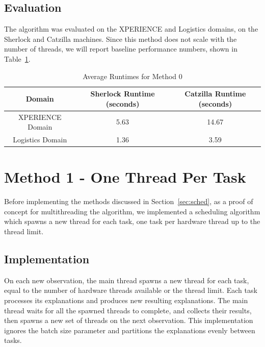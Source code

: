\documentclass[12pt,twoside,abbrevs,msc,ai,notimes,logo,sansheadings]{infthesis}
\begin{document}
  \section{Evaluation}
  
  The algorithm was evaluated on the XPERIENCE and Logistics domains, on the Sherlock and Catzilla machines. Since this method does not scale with the number of threads, we will report baseline performance numbers, shown in Table~\ref{tab:m0}.
  
  \begin{table}[!htbp]
  \begin{tabular}{c c c}
  Domain & Sherlock Runtime (seconds) & Catzilla Runtime (seconds)\tabularnewline
  \hline
  XPERIENCE Domain & 5.63 & 14.67\tabularnewline
  Logistics Domain & 1.36 & 3.59\tabularnewline
  \hline
  \end{tabular}
  \caption{Average Runtimes for Method 0}
  \label{tab:m0}
  \end{table}

  \chapter {Method 1 - One Thread Per Task}
  
  Before implementing the methods discussed in Section~\ref{sec:sched}, as a proof of concept for multithreading the algorithm, we implemented a scheduling algorithm which spawns a new thread for each task, one task per hardware thread up to the thread limit.
  
  \section {Implementation}
  
  On each new observation,  the main thread spawns a new thread for each task, equal to the number of hardware threads available or the thread limit. Each task processes its explanations and produces new resulting explanations. The main thread waits for all the spawned threads to complete, and collects their results, then spawns a new set of threads on the next observation. This implementation ignores the batch size parameter and partitions the explanations evenly between tasks.
  
\end{document}
